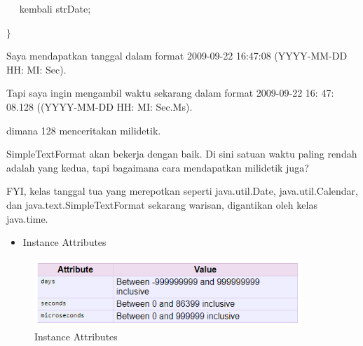 \noindent 
 $  $ $  $ $  $ $  $ kembali strDate; \par
\noindent 
 $  \}  $ \par
\vspace{\baselineskip}
\noindent 
Saya mendapatkan tanggal dalam format 2009-09-22 16:47:08 (YYYY-MM-DD HH: MI: Sec). \par
\vspace{12pt}
\noindent 
Tapi saya ingin mengambil waktu sekarang dalam format 2009-09-22 16: 47: 08.128 ((YYYY-MM-DD HH: MI: Sec.Ms). \par
\vspace{12pt}
\noindent 
dimana 128 menceritakan milidetik. \par
\vspace{12pt}
\noindent 
SimpleTextFormat akan bekerja dengan baik. Di sini satuan waktu paling rendah adalah yang kedua, tapi bagaimana cara mendapatkan milidetik juga? \par
\noindent 
FYI, kelas tanggal tua yang merepotkan seperti java.util.Date, java.util.Calendar, dan java.text.SimpleTextFormat sekarang warisan, digantikan oleh kelas java.time. \par
\vspace{12pt}
\vspace{14pt}

\begin{itemize}
	\item Instance Attributes
\end{itemize}

\begin{figure}[ht]
	\centerline{\includegraphics[width=0.90\textwidth]{figures/DateTime}}
	\caption{Instance Attributes}
	\label{Instance Attributes}
\end{figure}


